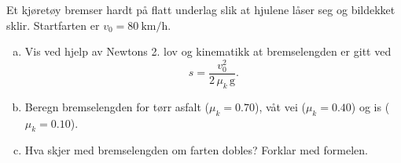 %
Et kjøretøy bremser hardt på flatt underlag slik at hjulene låser seg og bildekket sklir. Startfarten er $v_0 = \SI{80}{\kilo\metre\per\hour}$.
\begin{enumerate}[a)]
    \item Vis ved hjelp av Newtons 2. lov og kinematikk at bremselengden er gitt ved
    \[
        s = \frac{v_0^2}{2\,\mu_k\,\mathrm{g}}.
    \]
    \item Beregn bremselengden for tørr asfalt ($\mu_k = 0.70$), våt vei ($\mu_k = 0.40$) og is ($\mu_k = 0.10$).
    \item Hva skjer med bremselengden om farten dobles? Forklar med formelen.
\end{enumerate}
